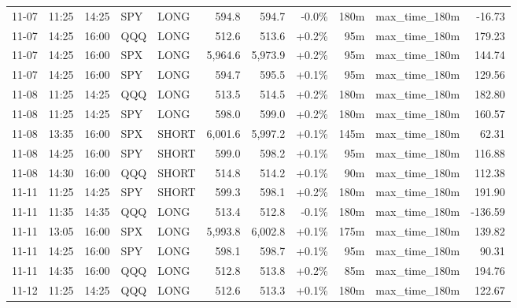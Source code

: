 \documentclass[11pt,a4paper,twoside]{article}
\begin{document}
\begin{center}
\begin{longtable}{>{\color{txtmain}}l l l l l r r r r >{\color{txtmain}}l r}
11-07 & 11:25 & 14:25 & SPY & LONG & 594.8 & 594.7 & \textcolor{lossred}{-0.0\%} & 180m & max\_time\_180m & \textcolor{lossred}{-16.73} \\
11-07 & 14:25 & 16:00 & QQQ & LONG & 512.6 & 513.6 & \textcolor{wingreen}{+0.2\%} & 95m & max\_time\_180m & \textcolor{wingreen}{179.23} \\
11-07 & 14:25 & 16:00 & SPX & LONG & 5,964.6 & 5,973.9 & \textcolor{wingreen}{+0.2\%} & 95m & max\_time\_180m & \textcolor{wingreen}{144.74} \\
11-07 & 14:25 & 16:00 & SPY & LONG & 594.7 & 595.5 & \textcolor{wingreen}{+0.1\%} & 95m & max\_time\_180m & \textcolor{wingreen}{129.56} \\
11-08 & 11:25 & 14:25 & QQQ & LONG & 513.5 & 514.5 & \textcolor{wingreen}{+0.2\%} & 180m & max\_time\_180m & \textcolor{wingreen}{182.80} \\
11-08 & 11:25 & 14:25 & SPY & LONG & 598.0 & 599.0 & \textcolor{wingreen}{+0.2\%} & 180m & max\_time\_180m & \textcolor{wingreen}{160.57} \\
11-08 & 13:35 & 16:00 & SPX & SHORT & 6,001.6 & 5,997.2 & \textcolor{wingreen}{+0.1\%} & 145m & max\_time\_180m & \textcolor{wingreen}{62.31} \\
11-08 & 14:25 & 16:00 & SPY & SHORT & 599.0 & 598.2 & \textcolor{wingreen}{+0.1\%} & 95m & max\_time\_180m & \textcolor{wingreen}{116.88} \\
11-08 & 14:30 & 16:00 & QQQ & SHORT & 514.8 & 514.2 & \textcolor{wingreen}{+0.1\%} & 90m & max\_time\_180m & \textcolor{wingreen}{112.38} \\
11-11 & 11:25 & 14:25 & SPY & SHORT & 599.3 & 598.1 & \textcolor{wingreen}{+0.2\%} & 180m & max\_time\_180m & \textcolor{wingreen}{191.90} \\
11-11 & 11:35 & 14:35 & QQQ & LONG & 513.4 & 512.8 & \textcolor{lossred}{-0.1\%} & 180m & max\_time\_180m & \textcolor{lossred}{-136.59} \\
11-11 & 13:05 & 16:00 & SPX & LONG & 5,993.8 & 6,002.8 & \textcolor{wingreen}{+0.1\%} & 175m & max\_time\_180m & \textcolor{wingreen}{139.82} \\
11-11 & 14:25 & 16:00 & SPY & LONG & 598.1 & 598.7 & \textcolor{wingreen}{+0.1\%} & 95m & max\_time\_180m & \textcolor{wingreen}{90.31} \\
11-11 & 14:35 & 16:00 & QQQ & LONG & 512.8 & 513.8 & \textcolor{wingreen}{+0.2\%} & 85m & max\_time\_180m & \textcolor{wingreen}{194.76} \\
11-12 & 11:25 & 14:25 & QQQ & LONG & 512.6 & 513.3 & \textcolor{wingreen}{+0.1\%} & 180m & max\_time\_180m & \textcolor{wingreen}{122.67} \\

\end{longtable}
\end{center}
\end{document}
